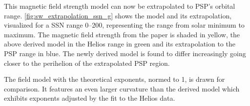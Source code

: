 This magnetic field strength model can now be extrapolated to PSP's orbital range. \autoref{fig:sw_extrapolation_ssn_g} shows the model and its extrapolation, visualized for a SSN range \numrange{0}{200}, representing the range from solar minimum to maximum. The magnetic field strength from the paper is shaded in yellow, the above derived model in the Helios range in green and its extrapolation to the PSP range in blue. The newly derived model is found to differ increasingly going closer to the perihelion of the extrapolated PSP region.
\begin{figure}[htb]
\end{figure}
The \citet{Parker1958} field model with the theoretical exponents, normed to \SI{1}{\au}, is drawn for comparison. It features an even larger curvature than the derived model which exhibits exponents adjusted by the fit to the Helios data.

